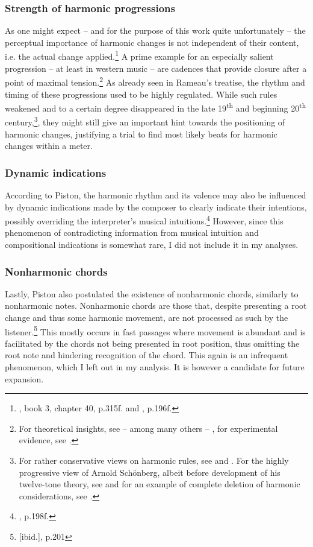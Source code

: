 \documentclass[a4paper,12pt]{report}
\begin{document}
\subsubsection{Strength of harmonic progressions}
As one might expect -- and for the purpose of this work quite unfortunately -- the perceptual importance of harmonic changes is not independent of their content, i.e. the actual change applied.\footnote{\cite{rameau1722traite}, book 3, chapter 40, p.315f. and \cite{piston1987harmony}, p.196f.} A prime example for an especially salient progression -- at least in western music -- are cadences that provide closure after a point of maximal tension.\footnote{For theoretical insights, see -- among many others -- \cite{jackendoff1983generative}, for experimental evidence, see \cite{bigand1999perceiving}.} As already seen in Rameau's treatise, the rhythm and timing of these progressions used to be highly regulated. While such rules weakened and to a certain degree disappeared in the late 19\textsuperscript{th} and beginning 20\textsuperscript{th} century,\footnote{For rather conservative views on harmonic rules, see \cite{riemann1893vereinfachte} and \cite{schenker1906harmonielehre}. For the highly progressive view of Arnold Sch\"onberg, albeit before development of his twelve-tone theory, see \cite{schonberg1922harmonielehre} and for an example of complete deletion of harmonic considerations, see \cite{schonberg1976stil}.}, they might still give an important hint towards the positioning of harmonic changes, justifying a trial to find most likely beats for harmonic changes within a meter.

\subsubsection{Dynamic indications}
According to Piston, the harmonic rhythm and its valence may also be influenced by dynamic indications made by the composer to clearly indicate their intentions, possibly overriding the interpreter's musical intuitions.\footnote{\cite{piston1987harmony}, p.198f.} However, since this phenomenon of contradicting information from musical intuition and compositional indications is somewhat rare, I did not include it in my analyses.

\subsubsection{Nonharmonic chords}
Lastly, Piston also postulated the existence of nonharmonic chords, similarly to nonharmonic notes. Nonharmonic chords are those that, despite presenting a root change and thus some harmonic movement, are not processed as such by the listener.\footnote{[ibid.], p.201} This mostly occurs in fast passages where movement is abundant and is facilitated by the chords not being presented in root position, thus omitting the root note and hindering recognition of the chord. This again is an infrequent phenomenon, which I left out in my analysis. It is however a candidate for future expansion.
\end{document}

